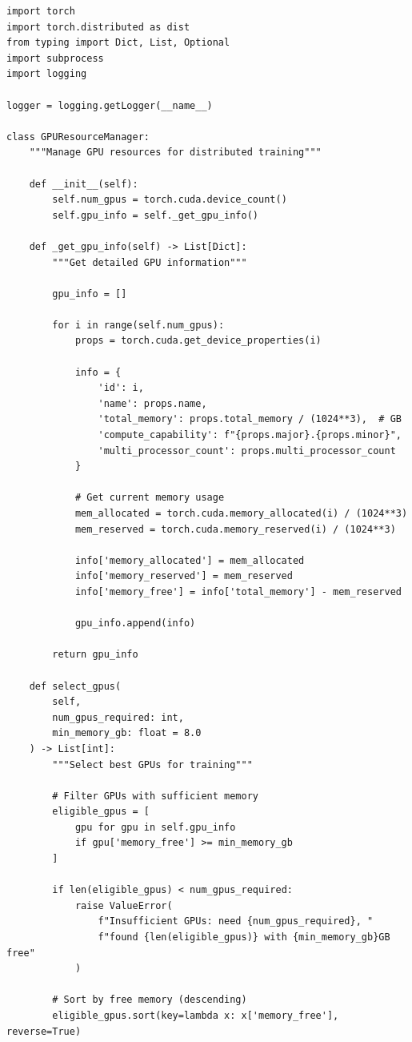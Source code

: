 \begin{lstlisting}[style=python, caption=Dynamic GPU Resource Allocation]
import torch
import torch.distributed as dist
from typing import Dict, List, Optional
import subprocess
import logging

logger = logging.getLogger(__name__)

class GPUResourceManager:
    """Manage GPU resources for distributed training"""

    def __init__(self):
        self.num_gpus = torch.cuda.device_count()
        self.gpu_info = self._get_gpu_info()

    def _get_gpu_info(self) -> List[Dict]:
        """Get detailed GPU information"""

        gpu_info = []

        for i in range(self.num_gpus):
            props = torch.cuda.get_device_properties(i)

            info = {
                'id': i,
                'name': props.name,
                'total_memory': props.total_memory / (1024**3),  # GB
                'compute_capability': f"{props.major}.{props.minor}",
                'multi_processor_count': props.multi_processor_count
            }

            # Get current memory usage
            mem_allocated = torch.cuda.memory_allocated(i) / (1024**3)
            mem_reserved = torch.cuda.memory_reserved(i) / (1024**3)

            info['memory_allocated'] = mem_allocated
            info['memory_reserved'] = mem_reserved
            info['memory_free'] = info['total_memory'] - mem_reserved

            gpu_info.append(info)

        return gpu_info

    def select_gpus(
        self,
        num_gpus_required: int,
        min_memory_gb: float = 8.0
    ) -> List[int]:
        """Select best GPUs for training"""

        # Filter GPUs with sufficient memory
        eligible_gpus = [
            gpu for gpu in self.gpu_info
            if gpu['memory_free'] >= min_memory_gb
        ]

        if len(eligible_gpus) < num_gpus_required:
            raise ValueError(
                f"Insufficient GPUs: need {num_gpus_required}, "
                f"found {len(eligible_gpus)} with {min_memory_gb}GB free"
            )

        # Sort by free memory (descending)
        eligible_gpus.sort(key=lambda x: x['memory_free'], reverse=True)


\end{lstlisting}
